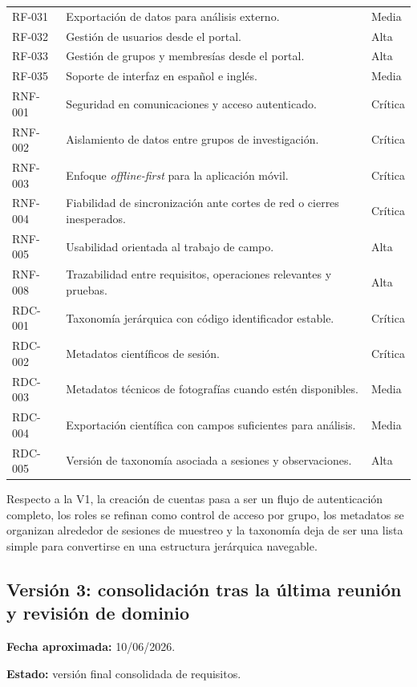 {\begin{longtable}{>{\raggedright\arraybackslash}p{1.8cm} >{\raggedright\arraybackslash}p{10.1cm} >{\raggedright\arraybackslash}p{2.1cm}}
  RF-031 & Exportación de datos para análisis externo. & Media \\
  RF-032 & Gestión de usuarios desde el portal. & Alta \\
  RF-033 & Gestión de grupos y membresías desde el portal. & Alta \\
  RF-035 & Soporte de interfaz en español e inglés. & Media \\
  RNF-001 & Seguridad en comunicaciones y acceso autenticado. & Crítica \\
  RNF-002 & Aislamiento de datos entre grupos de investigación. & Crítica \\
  RNF-003 & Enfoque \textit{offline-first} para la aplicación móvil. & Crítica \\
  RNF-004 & Fiabilidad de sincronización ante cortes de red o cierres inesperados. & Crítica \\
  RNF-005 & Usabilidad orientada al trabajo de campo. & Alta \\
  RNF-008 & Trazabilidad entre requisitos, operaciones relevantes y pruebas. & Alta \\
  RDC-001 & Taxonomía jerárquica con código identificador estable. & Crítica \\
  RDC-002 & Metadatos científicos de sesión. & Crítica \\
  RDC-003 & Metadatos técnicos de fotografías cuando estén disponibles. & Media \\
  RDC-004 & Exportación científica con campos suficientes para análisis. & Media \\
  RDC-005 & Versión de taxonomía asociada a sesiones y observaciones. & Alta \\
  \bottomrule
\end{longtable}
}

Respecto a la V1, la creación de cuentas pasa a ser un flujo de autenticación
completo, los roles se refinan como control de acceso por grupo, los metadatos se
organizan alrededor de sesiones de muestreo y la taxonomía deja de ser una lista
simple para convertirse en una estructura jerárquica navegable.

\subsection{Versión 3: consolidación tras la última reunión y revisión de dominio}

\textbf{Fecha aproximada:} 10/06/2026.

\textbf{Estado:} versión final consolidada de requisitos.

